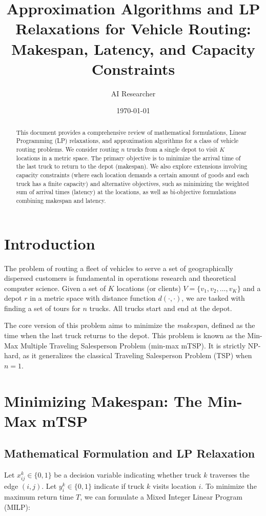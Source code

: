 \documentclass[11pt]{article}
\title{Approximation Algorithms and LP Relaxations for Vehicle Routing: \\ Makespan, Latency, and Capacity Constraints}
\author{AI Researcher}
\date{\today}
\begin{document}
\maketitle

\begin{abstract}
This document provides a comprehensive review of mathematical formulations, Linear Programming (LP) relaxations, and approximation algorithms for a class of vehicle routing problems. We consider routing $n$ trucks from a single depot to visit $K$ locations in a metric space. The primary objective is to minimize the arrival time of the last truck to return to the depot (makespan). We also explore extensions involving capacity constraints (where each location demands a certain amount of goods and each truck has a finite capacity) and alternative objectives, such as minimizing the weighted sum of arrival times (latency) at the locations, as well as bi-objective formulations combining makespan and latency.
\end{abstract}

\section{Introduction}

The problem of routing a fleet of vehicles to serve a set of geographically dispersed customers is fundamental in operations research and theoretical computer science. Given a set of $K$ locations (or clients) $V = \{v_1, v_2, \dots, v_K\}$ and a depot $r$ in a metric space with distance function $d(\cdot, \cdot)$, we are tasked with finding a set of tours for $n$ trucks. All trucks start and end at the depot. 

The core version of this problem aims to minimize the \emph{makespan}, defined as the time when the last truck returns to the depot. This problem is known as the Min-Max Multiple Traveling Salesperson Problem (min-max mTSP). It is strictly NP-hard, as it generalizes the classical Traveling Salesperson Problem (TSP) when $n=1$.

\section{Minimizing Makespan: The Min-Max mTSP}

\subsection{Mathematical Formulation and LP Relaxation}
Let $x_{ij}^k \in \{0,1\}$ be a decision variable indicating whether truck $k$ traverses the edge $(i,j)$. Let $y_i^k \in \{0,1\}$ indicate if truck $k$ visits location $i$. 
To minimize the maximum return time $T$, we can formulate a Mixed Integer Linear Program (MILP):
\end{document}
